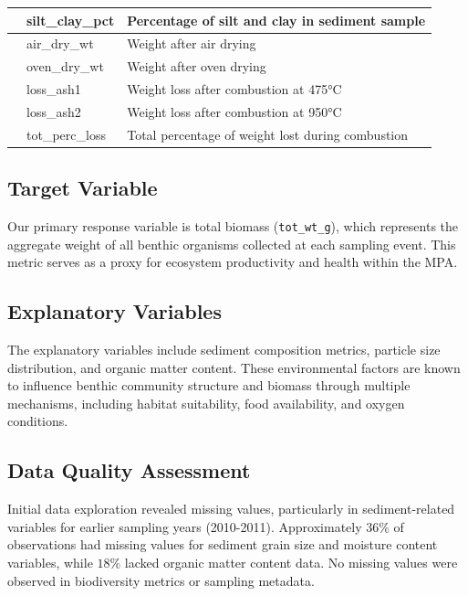 \documentclass[12pt]{article}
\begin{document}
\begin{table}[htbp]
\begin{tabularx}{\textwidth}{>{\raggedright\arraybackslash}p{3cm}>{\ttfamily\raggedright\arraybackslash}p{3.5cm}>{\raggedright\arraybackslash}X}
    & silt\_clay\_pct & Percentage of silt and clay in sediment sample \\
\hline
\multirow{5}{=}{Organic matter content} 
    & air\_dry\_wt & Weight after air drying \\
    & oven\_dry\_wt & Weight after oven drying \\
    & loss\_ash1 & Weight loss after combustion at 475°C \\
    & loss\_ash2 & Weight loss after combustion at 950°C \\
    & tot\_perc\_loss & Total percentage of weight lost during combustion \\
\hline
\end{tabularx}
\end{table}


\subsection{Target Variable}

\qquad Our primary response variable is total biomass (\texttt{tot\_wt\_g}), which represents the aggregate weight of all benthic organisms collected at each sampling event. This metric serves as a proxy for ecosystem productivity and health within the MPA.

\subsection{Explanatory Variables}

\qquad The explanatory variables include sediment composition metrics, particle size distribution, and organic matter content. These environmental factors are known to influence benthic community structure and biomass through multiple mechanisms, including habitat suitability, food availability, and oxygen conditions.

\subsection{Data Quality Assessment}

\qquad Initial data exploration revealed missing values, particularly in sediment-related variables for earlier sampling years (2010-2011). Approximately $36\%$ of observations had missing values for sediment grain size and moisture content variables, while $18\%$ lacked organic matter content data. No missing values were observed in biodiversity metrics or sampling metadata.

\newpage
\end{document}

